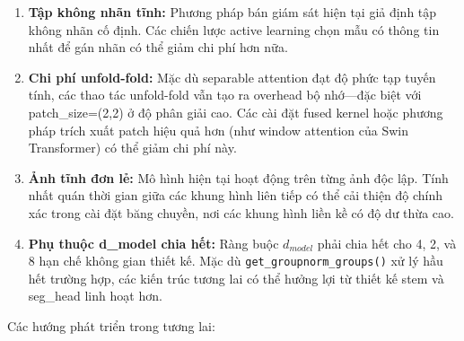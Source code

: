 \documentclass[conference]{IEEEtran}
\begin{document}
\begin{enumerate}
    \item \textbf{Tập không nhãn tĩnh:} Phương pháp bán giám sát hiện tại giả định tập không nhãn cố định. Các chiến lược active learning chọn mẫu có thông tin nhất để gán nhãn có thể giảm chi phí hơn nữa.

    \item \textbf{Chi phí unfold-fold:} Mặc dù separable attention đạt độ phức tạp tuyến tính, các thao tác unfold-fold vẫn tạo ra overhead bộ nhớ---đặc biệt với patch\_size=(2,2) ở độ phân giải cao. Các cài đặt fused kernel hoặc phương pháp trích xuất patch hiệu quả hơn (như window attention của Swin Transformer) có thể giảm chi phí này.

    \item \textbf{Ảnh tĩnh đơn lẻ:} Mô hình hiện tại hoạt động trên từng ảnh độc lập. Tính nhất quán thời gian giữa các khung hình liên tiếp có thể cải thiện độ chính xác trong cài đặt băng chuyền, nơi các khung hình liền kề có độ dư thừa cao.

    \item \textbf{Phụ thuộc d_model chia hết:} Ràng buộc $d_{model}$ phải chia hết cho 4, 2, và 8 hạn chế không gian thiết kế. Mặc dù \texttt{get\_groupnorm\_groups()} xử lý hầu hết trường hợp, các kiến trúc tương lai có thể hưởng lợi từ thiết kế stem và seg\_head linh hoạt hơn.
\end{enumerate}

Các hướng phát triển trong tương lai:
\end{document}
